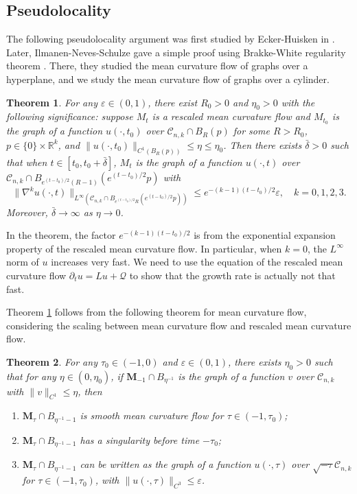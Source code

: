 \documentclass[11pt]{amsart}
\numberwithin{equation}{section}
\newtheorem{theorem}{Theorem}[section]
\numberwithin{equation}{section}
\newcommand{\eps}{\varepsilon}
\newcommand{\bM}{\mathbf{M}}
\newcommand{\cC}{\mathcal{C}}
\newcommand{\cQ}{\mathcal{Q}}
\newcommand{\R}{\mathbb{R}}
\begin{document}
	
	\subsection{Pseudolocality}\label{SSPL}
	The following pseudolocality argument was first studied by Ecker-Huisken in \cite{EH}. Later, Ilmanen-Neves-Schulze \cite[Section 9]{INS} gave a simple proof using Brakke-White regularity theorem \cite{Wh4}. There, they studied the mean curvature flow of graphs over a hyperplane, and we study the mean curvature flow of graphs over a cylinder.
	
	\begin{theorem}\label{thm:pseudo-locality}
		For any $\eps\in(0,1)$, there exist $R_0>0$ and $\eta_0>0$ with the following significance: suppose $M_t$ is a rescaled mean curvature flow and $M_{t_0}$ is the graph of a function $u(\cdot,t_0)$ over $\cC_{n,k}\cap B_R(p)$ for some $R>R_0$, $p\in\{0\}\times\R^k$, and $\|u(\cdot,t_0)\|_{C^1(B_R(p))}\leq\eta\leq \eta_0$. Then there exists $\bar\delta >0$ such that when $t\in[t_0,t_0+\bar\delta]$, $M_t$ is the graph of a function $u(\cdot,t)$ over $\cC_{n,k}\cap B_{e^{(t-t_0)/2}(R-1)}(e^{(t-t_0)/2}p)$ with $$\|\nabla^ku(\cdot,t)\|_{L^\infty(\cC_{n,k}\cap B_{e^{(t-t_0)/2}R}(e^{(t-t_0)/2}p))}\leq e^{-(k-1)(t-t_0)/2}\eps, \quad k=0,1,2,3.$$ Moreover, $\bar\delta\to\infty$ as $\eta\to 0$.
		
	\end{theorem}
	
	In the theorem, the factor $e^{-(k-1)(t-t_0)/2}$ is from the exponential expansion property of the rescaled mean curvature flow. In particular, when $k=0$, the $L^\infty$ norm of $u$ increases very fast. We need to use the equation of the rescaled mean curvature flow $\partial_t u=Lu+\cQ$ to show that the growth rate is actually not that fast.
	
	Theorem \ref{thm:pseudo-locality} follows from the following theorem for mean curvature flow, considering the scaling between mean curvature flow and rescaled mean curvature flow. 
	\begin{theorem}
		For any $\tau_0\in(-1,0)$ and $\eps\in(0,1)$, there exists $\eta_0>0$ such that for any $\eta\in(0,\eta_0)$, if $\bM_{-1}\cap B_{\eta^{-1}}$ is the graph of a function $v$ over $\cC_{n,k}$ with $\|v\|_{C^1}\leq \eta$, then 
		\begin{enumerate}
			\item $\bM_{\tau}\cap B_{\eta^{-1}-1}$ is smooth mean curvature flow for $\tau\in(-1,\tau_0)$;
			\item $\bM_{\tau}\cap B_{\eta^{-1}-1}$ has a singularity before time $-\tau_0$;
			\item $\bM_{\tau}\cap B_{\eta^{-1}-1}$ can be written as the graph of a function $u(\cdot,\tau)$ over $\sqrt{-\tau}\cC_{n,k}$ for $\tau\in(-1,\tau_0)$, with $\|u(\cdot,\tau)\|_{C^3}\leq \eps$.
		\end{enumerate}
	\end{theorem}
	
\end{document}
